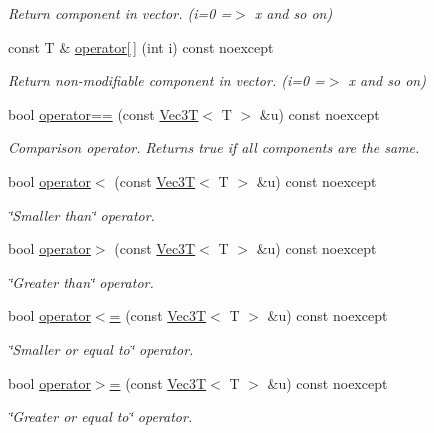 \begin{DoxyCompactItemize}
\begin{DoxyCompactList}\small\item\em Return component in vector. (i=0 =$>$ x and so on) \end{DoxyCompactList}\item 
const T \& \hyperlink{classVec3T_ad09224c5f7e142059d75772c0cbd1990}{operator\mbox{[}$\,$\mbox{]}} (int i) const noexcept
\begin{DoxyCompactList}\small\item\em Return non-\/modifiable component in vector. (i=0 =$>$ x and so on) \end{DoxyCompactList}\item 
bool \hyperlink{classVec3T_a715546682c26647643148a80087c4ab4}{operator==} (const \hyperlink{classVec3T}{Vec3T}$<$ T $>$ \&u) const noexcept
\begin{DoxyCompactList}\small\item\em Comparison operator. Returns true if all components are the same. \end{DoxyCompactList}\item 
bool \hyperlink{classVec3T_aba830919c5020bb060f39fe9df6b7ca1}{operator$<$} (const \hyperlink{classVec3T}{Vec3T}$<$ T $>$ \&u) const noexcept
\begin{DoxyCompactList}\small\item\em \char`\"{}\+Smaller than\char`\"{} operator. \end{DoxyCompactList}\item 
bool \hyperlink{classVec3T_af99810068907e4935ac38bc397ba1102}{operator$>$} (const \hyperlink{classVec3T}{Vec3T}$<$ T $>$ \&u) const noexcept
\begin{DoxyCompactList}\small\item\em \char`\"{}\+Greater than\char`\"{} operator. \end{DoxyCompactList}\item 
bool \hyperlink{classVec3T_a266a34a83b9f23a391151be45a4e39f8}{operator$<$=} (const \hyperlink{classVec3T}{Vec3T}$<$ T $>$ \&u) const noexcept
\begin{DoxyCompactList}\small\item\em \char`\"{}\+Smaller or equal to\char`\"{} operator. \end{DoxyCompactList}\item 
bool \hyperlink{classVec3T_a3296f8319642088e08bd2d3e253fcd64}{operator$>$=} (const \hyperlink{classVec3T}{Vec3T}$<$ T $>$ \&u) const noexcept
\begin{DoxyCompactList}\small\item\em \char`\"{}\+Greater or equal to\char`\"{} operator. \end{DoxyCompactList}\item 

\end{DoxyCompactItemize}
